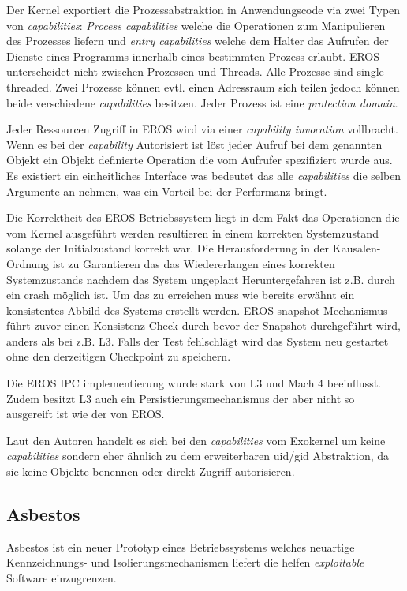 \documentclass[9pt,technote]{IEEEtran}
\begin{document}
        Der Kernel exportiert die Prozessabstraktion in Anwendungscode via zwei Typen von \textit{capabilities}:
        \textit{Process capabilities} welche die Operationen zum Manipulieren des Prozesses liefern und \textit{entry capabilities} welche dem Halter das Aufrufen der Dienste eines Programms
        innerhalb eines bestimmten Prozess erlaubt. EROS unterscheidet nicht zwischen Prozessen und Threads. Alle Prozesse sind single-threaded. Zwei Prozesse k\"onnen evtl.
        einen Adressraum sich teilen jedoch k\"onnen beide verschiedene \textit{capabilities} besitzen. Jeder Prozess ist eine \textit{protection domain}.
        
        Jeder Ressourcen Zugriff in EROS wird via einer \textit{capability invocation} vollbracht. Wenn es bei der \textit{capability} Autorisiert ist l\"ost jeder Aufruf
        bei dem genannten Objekt ein Objekt definierte Operation die vom Aufrufer spezifiziert wurde aus. Es existiert ein einheitliches Interface was bedeutet das alle \textit{capabilities}
        die selben Argumente an nehmen, was ein Vorteil bei der Performanz bringt.
        
        Die Korrektheit des EROS Betriebssystem liegt in dem Fakt das Operationen die vom Kernel ausgef\"uhrt werden resultieren in einem korrekten Systemzustand solange
        der Initialzustand korrekt war. Die Herausforderung in der Kausalen-Ordnung ist zu Garantieren das das Wiedererlangen eines korrekten Systemzustands nachdem das System ungeplant 
        Heruntergefahren ist z.B. durch ein crash m\"oglich ist. Um das zu erreichen muss wie bereits erw\"ahnt ein konsistentes Abbild des Systems erstellt werden.
        EROS snapshot Mechanismus f\"uhrt zuvor einen Konsistenz Check durch bevor der Snapshot durchgef\"uhrt wird, anders als bei z.B. L3. Falls der Test fehlschl\"agt 
        wird das System neu gestartet ohne den derzeitigen Checkpoint zu speichern. 
        
        Die EROS IPC implementierung wurde stark von L3 und Mach 4 beeinflusst. Zudem besitzt L3 auch ein Persistierungsmechanismus der aber nicht so ausgereift ist wie der von EROS.
        
        Laut den Autoren \cite{inproc:eros} handelt es sich bei den \textit{capabilities} vom Exokernel um keine \textit{capabilities} sondern eher \"ahnlich zu dem erweiterbaren uid/gid Abstraktion,
        da sie keine Objekte benennen oder direkt Zugriff autorisieren.
        
    \subsection{Asbestos}        
      Asbestos ist ein neuer Prototyp eines Betriebssystems welches neuartige Kennzeichnungs- und Isolierungsmechanismen liefert die helfen \textit{exploitable} Software einzugrenzen.
\end{document}
